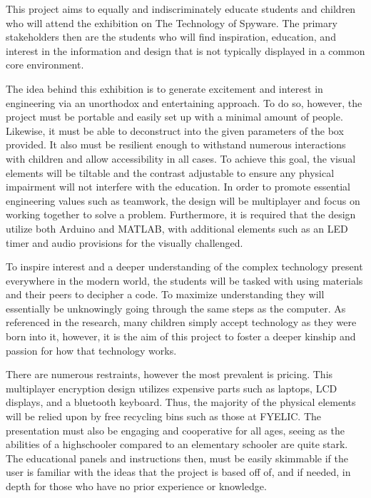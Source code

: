 \documentclass[conference]{IEEEtran}
\begin{document}
\par This project aims to equally and indiscriminately educate students and children who will attend the exhibition on The Technology of Spyware. The primary stakeholders then are the students who will find inspiration, education, and interest in the information and design that is not typically displayed in a common core environment. 
\par The idea behind this exhibition is to generate excitement and interest in engineering via an unorthodox and entertaining approach. To do so, however, the project must be portable and easily set up with a minimal amount of people. Likewise, it must be able to deconstruct into the given parameters of the box provided. It also must be resilient enough to withstand numerous interactions with children and allow accessibility in all cases. To achieve this goal, the visual elements will be tiltable and the contrast adjustable to ensure any physical impairment will not interfere with the education. In order to promote essential engineering values such as teamwork, the design will be multiplayer and focus on working together to solve a problem. Furthermore, it is required that the design utilize both Arduino and MATLAB, with additional elements such as an LED timer and audio provisions for the visually challenged.
\par To inspire interest and a deeper understanding of the complex technology present everywhere in the modern world, the students will be tasked with using materials and their peers to decipher a code. To maximize understanding they will essentially be unknowingly going through the same steps as the computer. As referenced in the research, many children simply accept technology as they were born into it, however, it is the aim of this project to foster a deeper kinship and passion for how that technology works.
\par There are numerous restraints, however the most prevalent is pricing. This multiplayer encryption design utilizes expensive parts such as laptops, LCD displays, and a bluetooth keyboard. Thus, the majority of the physical elements will be relied upon by free recycling bins such as those at FYELIC. The presentation must also be engaging and cooperative for all ages, seeing as the abilities of a highschooler compared to an elementary schooler are quite stark. The educational panels and instructions then, must be easily skimmable if the user is familiar with the ideas that the project is based off of, and if needed, in depth for those who have no prior experience or knowledge.
\end{document}
